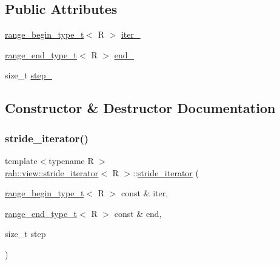 \subsection*{Public Attributes}
\begin{DoxyCompactItemize}
\item 
\mbox{\hyperlink{namespacerah_a28aff4eeddcece6be65ff0b956d32d4a}{range\+\_\+begin\+\_\+type\+\_\+t}}$<$ R $>$ \mbox{\hyperlink{structrah_1_1view_1_1stride__iterator_a65e7fa92e8026ce48e3c132e808e9ffc}{iter\+\_\+}}
\item 
\mbox{\hyperlink{namespacerah_a9657e24ae477f4482225b133fe286b65}{range\+\_\+end\+\_\+type\+\_\+t}}$<$ R $>$ \mbox{\hyperlink{structrah_1_1view_1_1stride__iterator_abd80314a0e4408629e33f43b5272f74e}{end\+\_\+}}
\item 
size\+\_\+t \mbox{\hyperlink{structrah_1_1view_1_1stride__iterator_a1b2e6cfb0631cde24284f56b17a4452c}{step\+\_\+}}
\end{DoxyCompactItemize}


\subsection{Constructor \& Destructor Documentation}
\mbox{\label{structrah_1_1view_1_1stride__iterator_a47ddd2ce0f295fa825919f04431d64a9}} 
\subsubsection{\texorpdfstring{stride\_iterator()}{stride\_iterator()}}
{\footnotesize\ttfamily template$<$typename R $>$ \\
\mbox{\hyperlink{structrah_1_1view_1_1stride__iterator}{rah\+::view\+::stride\+\_\+iterator}}$<$ R $>$\+::\mbox{\hyperlink{structrah_1_1view_1_1stride__iterator}{stride\+\_\+iterator}} (\begin{DoxyParamCaption}\item[{\mbox{\hyperlink{namespacerah_a28aff4eeddcece6be65ff0b956d32d4a}{range\+\_\+begin\+\_\+type\+\_\+t}}$<$ R $>$ const \&}]{iter,  }\item[{\mbox{\hyperlink{namespacerah_a9657e24ae477f4482225b133fe286b65}{range\+\_\+end\+\_\+type\+\_\+t}}$<$ R $>$ const \&}]{end,  }\item[{size\+\_\+t}]{step }\end{DoxyParamCaption})\hspace{0.3cm}{\ttfamily [inline]}}



